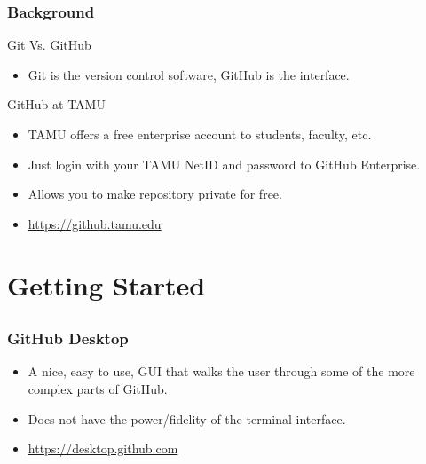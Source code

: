 \documentclass[]{beamer}
\begin{document}
\begin{frame}[t]\frametitle{Background}
  \begin{block}{Git Vs. GitHub}
    \begin{itemize}
      \item Git is the version control software, GitHub is the interface.
    \end{itemize}
  \end{block}
  \begin{block}{GitHub at TAMU}
  \begin{itemize}
    \item TAMU offers a free enterprise account to students, faculty, etc.
    \item Just login with your TAMU NetID and password to GitHub Enterprise.
    \item Allows you to make repository private for free.
    \item \url{https://github.tamu.edu}
  \end{itemize}
\end{block}
\end{frame}

\section{Getting Started}
\subsection{}

\begin{frame}[t]\frametitle{GitHub Desktop}
\begin{block}{}
\begin{itemize}
  \item A nice, easy to use, GUI that walks the user through some of the more complex parts of GitHub.
  \item Does not have the power/fidelity of the terminal interface.
  \item \url{https://desktop.github.com}
\end{itemize}
\end{block}
\end{frame}
\end{document}
